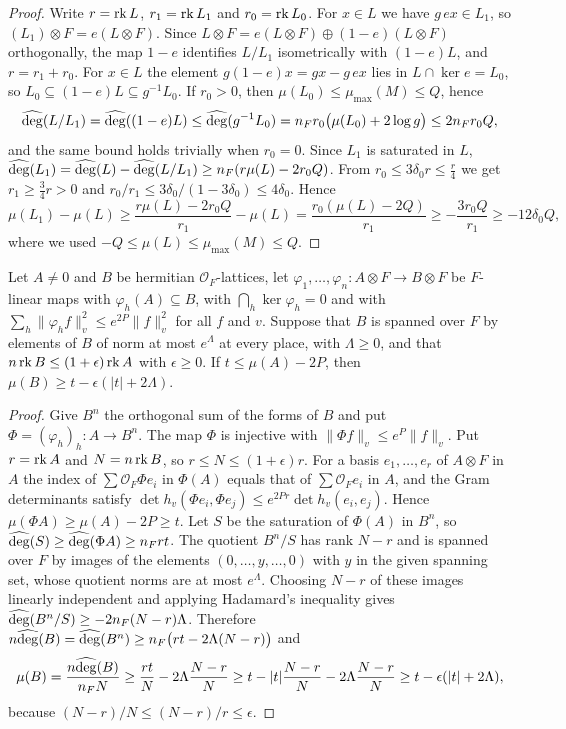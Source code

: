 \begin{proof}
Write $r=\operatorname{rk} L$, $r_1=\operatorname{rk} L_1$ and $r_0=\operatorname{rk} L_0$. For $x\in L$ we have $g\,ex\in L_1$, so $(L_1)\otimes F=e(L\otimes F)$. Since $L\otimes F=e(L\otimes F)\oplus(1-e)(L\otimes F)$ orthogonally, the map $1-e$ identifies $L/L_1$ isometrically with $(1-e)L$, and $r=r_1+r_0$. For $x\in L$ the element $g(1-e)x=gx-g\,ex$ lies in $L\cap\ker e=L_0$, so $L_0\subseteq(1-e)L\subseteq g^{-1}L_0$. If $r_0>0$, then $\mu(L_0)\le\mu_{\max}(M)\le Q$, hence
\[
\widehat{\deg}(L/L_1)=\widehat{\deg}((1-e)L)\le\widehat{\deg}(g^{-1}L_0)=n_Fr_0\big(\mu(L_0)+2\log g\big)\le2n_Fr_0Q,
\]
and the same bound holds trivially when $r_0=0$. Since $L_1$ is saturated in $L$, $\widehat{\deg}(L_1)=\widehat{\deg}(L)-\widehat{\deg}(L/L_1)\ge n_F(r\mu(L)-2r_0Q)$. From $r_0\le3\delta_0r\le\frac r4$ we get $r_1\ge\frac34r>0$ and $r_0/r_1\le3\delta_0/(1-3\delta_0)\le4\delta_0$. Hence
\[
\mu(L_1)-\mu(L)\ge\frac{r\mu(L)-2r_0Q}{r_1}-\mu(L)=\frac{r_0(\mu(L)-2Q)}{r_1}\ge-\frac{3r_0Q}{r_1}\ge-12\delta_0Q,
\]
where we used $-Q\le\mu(L)\le\mu_{\max}(M)\le Q$.
\end{proof}

\begin{lemma}[descent]\label{cov:descent}
Let $A\ne0$ and $B$ be hermitian $\mathcal O_F$-lattices, let $\varphi_1,\dots,\varphi_n\colon A\otimes F\to B\otimes F$ be $F$-linear maps with $\varphi_h(A)\subseteq B$, with $\bigcap_h\ker\varphi_h=0$ and with $\sum_h\lVert\varphi_hf\rVert_v^2\le e^{2P}\lVert f\rVert_v^2$ for all $f$ and $v$. Suppose that $B$ is spanned over $F$ by elements of $B$ of norm at most $e^\Lambda$ at every place, with $\Lambda\ge0$, and that $n\operatorname{rk} B\le(1+\epsilon)\operatorname{rk} A$ with $\epsilon\ge0$. If $t\le\mu(A)-2P$, then $\mu(B)\ge t-\epsilon(\lvert t\rvert+2\Lambda)$.
\end{lemma}

\begin{proof}
Give $B^n$ the orthogonal sum of the forms of $B$ and put $\Phi=(\varphi_h)_h\colon A\to B^n$. The map $\Phi$ is injective with $\lVert\Phi f\rVert_v\le e^P\lVert f\rVert_v$. Put $r=\operatorname{rk} A$ and $N=n\operatorname{rk} B$, so $r\le N\le(1+\epsilon)r$. For a basis $e_1,\dots,e_r$ of $A\otimes F$ in $A$ the index of $\sum\mathcal O_F\Phi e_i$ in $\Phi(A)$ equals that of $\sum\mathcal O_Fe_i$ in $A$, and the Gram determinants satisfy $\det h_v(\Phi e_i,\Phi e_j)\le e^{2Pr}\det h_v(e_i,e_j)$. Hence $\mu(\Phi A)\ge\mu(A)-2P\ge t$. Let $S$ be the saturation of $\Phi(A)$ in $B^n$, so $\widehat{\deg}(S)\ge\widehat{\deg}(\Phi A)\ge n_Frt$. The quotient $B^n/S$ has rank $N-r$ and is spanned over $F$ by images of the elements $(0,\dots,y,\dots,0)$ with $y$ in the given spanning set, whose quotient norms are at most $e^\Lambda$. Choosing $N-r$ of these images linearly independent and applying Hadamard's inequality gives $\widehat{\deg}(B^n/S)\ge-2n_F(N-r)\Lambda$. Therefore $n\widehat{\deg}(B)=\widehat{\deg}(B^n)\ge n_F\big(rt-2\Lambda(N-r)\big)$ and
\[
\mu(B)=\frac{n\widehat{\deg}(B)}{n_FN}\ge\frac{rt}N-2\Lambda\frac{N-r}N\ge t-\lvert t\rvert\frac{N-r}N-2\Lambda\frac{N-r}N\ge t-\epsilon(\lvert t\rvert+2\Lambda),
\]
because $(N-r)/N\le(N-r)/r\le\epsilon$.
\end{proof}

